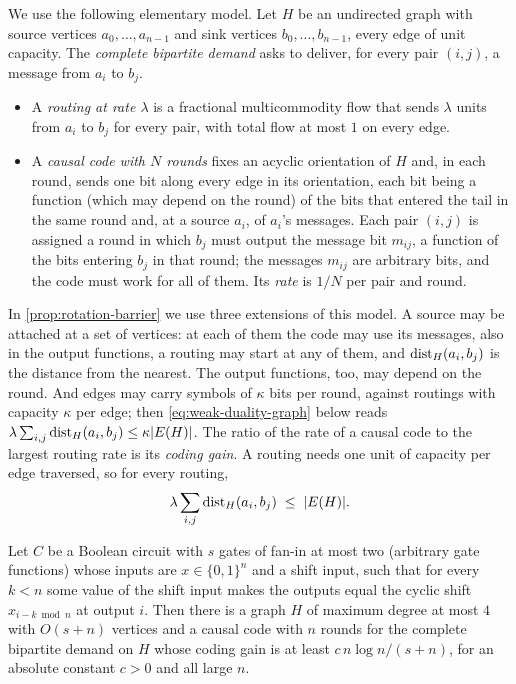 We use the following elementary model. Let $H$ be an undirected graph with source vertices
$a_0,\dots,a_{n-1}$ and sink vertices $b_0,\dots,b_{n-1}$, every edge of unit capacity. The
\emph{complete bipartite demand} asks to deliver, for every pair $(i,j)$, a message from $a_i$ to $b_j$.
\begin{itemize}[leftmargin=2em]
\item A \emph{routing at rate $\lambda$} is a fractional multicommodity flow that sends $\lambda$ units
from $a_i$ to $b_j$ for every pair, with total flow at most $1$ on every edge.
\item A \emph{causal code with $N$ rounds} fixes an acyclic orientation of $H$ and, in each round, sends
one bit along every edge in its orientation, each bit being a function (which may depend on the round) of the
bits that entered the tail in the same round and, at a source $a_i$, of $a_i$'s messages. Each pair $(i,j)$ is assigned a
round in which $b_j$ must output the message bit $m_{ij}$, a function of the bits entering $b_j$ in
that round; the messages $m_{ij}$ are arbitrary bits, and the code must work for all of them. Its
\emph{rate} is $1/N$ per pair and round.
\end{itemize}
In \cref{prop:rotation-barrier} we use three extensions of this model. A source may be attached at a set of
vertices: at each of them the code may use its messages, also in the output functions, a routing may start at any
of them, and $\operatorname{dist}_H(a_i,b_j)$ is the distance from the nearest. The output functions, too, may depend on the round. And edges
may carry symbols of $\kappa$ bits per round, against routings with capacity $\kappa$ per edge; then
\eqref{eq:weak-duality-graph} below reads $\lambda\sum_{i,j}\operatorname{dist}_H(a_i,b_j)\le\kappa\lvert E(H) \rvert$.
The ratio of the rate of a causal code to the largest routing rate is its \emph{coding gain}. A routing
needs one unit of capacity per edge traversed, so for every routing,
\begin{equation}\label{eq:weak-duality-graph}
  \lambda\sum_{i,j}\operatorname{dist}_H(a_i,b_j)\;\le\;\lvert E(H) \rvert .
\end{equation}

\begin{proposition}\label{prop:circuit-barrier}
\notformalized
Let $C$ be a Boolean circuit with $s$ gates of fan-in at most two (arbitrary gate functions) whose
inputs are $x\in\{0,1\}^n$ and a shift input, such that for every $k<n$ some value of the shift input
makes the outputs equal the cyclic shift $x_{i-k\bmod n}$ at output $i$. Then there is a graph $H$ of
maximum degree at most $4$ with $O(s+n)$ vertices and a causal code with $n$ rounds for the complete
bipartite demand on $H$ whose coding gain is at least $c\,n\log n/(s+n)$, for an absolute constant
$c>0$ and all large $n$.
\end{proposition}

